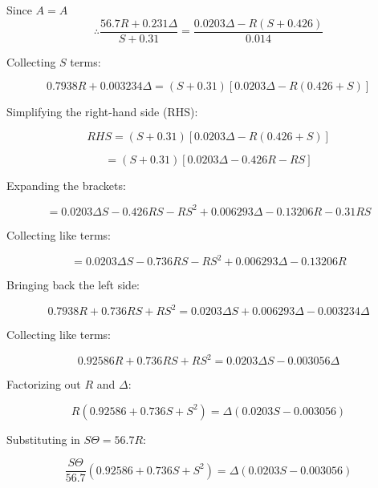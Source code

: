 \documentclass{article}
\numberwithin{equation}{section}
\begin{document}
Since \(A=A\)
\begin{equation}
\therefore \frac{56.7R + 0.231 \Delta}{S + 0.31} = \frac{0.0203\Delta - R(S + 0.426)}{0.014}
\end{equation}

Collecting \(S\) terms:

\begin{equation}
0.7938R + 0.003234 \Delta = (S + 0.31)[0.0203\Delta - R(0.426 + S)]
\end{equation}

Simplifying the right-hand side (RHS):

\begin{equation}
RHS = (S + 0.31)[0.0203\Delta - R(0.426 + S)]
\end{equation}

\begin{equation}
= (S + 0.31)[0.0203\Delta - 0.426R - RS]
\end{equation}

Expanding the brackets:

\begin{equation}
= 0.0203\Delta S - 0.426RS - RS^2 + 0.006293\Delta - 0.13206R - 0.31RS
\end{equation}

Collecting like terms:

\begin{equation}
= 0.0203 \Delta S - 0.736RS - RS^2 + 0.006293\Delta - 0.13206R
\end{equation}

Bringing back the left side:

\begin{equation}
0.7938R + 0.736 RS + RS^2 = 0.0203\Delta S + 0.006293\Delta - 0.003234\Delta
\end{equation}

Collecting like terms:

\begin{equation}
0.92586R + 0.736 RS + RS^2 = 0.0203 \Delta S - 0.003056\Delta
\end{equation}

Factorizing out \(R\) and \(\Delta\):

\begin{equation}
R(0.92586 + 0.736S + S^2) = \Delta(0.0203S - 0.003056)
\end{equation}

Substituting in \(S\Theta = 56.7R\):

\begin{equation}
\frac{S\Theta}{56.7}(0.92586 + 0.736S + S^2) = \Delta(0.0203S - 0.003056)
\end{equation}
\end{document}
